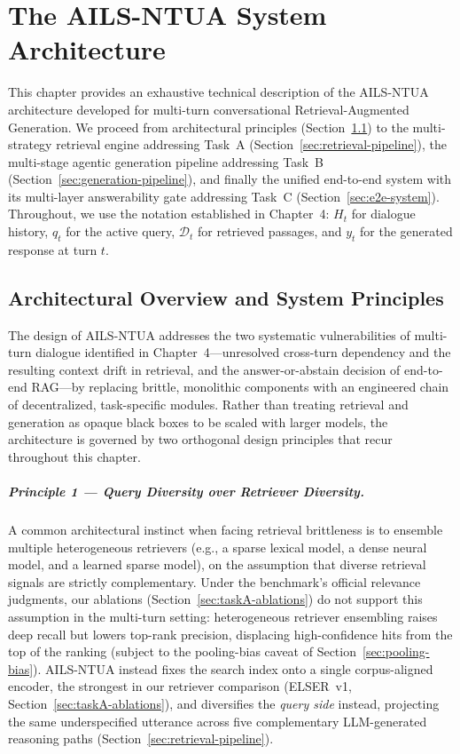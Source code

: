 \chapter{The AILS-NTUA System Architecture}
\label{chapter:system}

This chapter provides an exhaustive technical description of the AILS-NTUA architecture developed for multi-turn conversational Retrieval-Augmented Generation. We proceed from architectural principles (Section~\ref{sec:arch-overview}) to the multi-strategy retrieval engine addressing Task~A (Section~\ref{sec:retrieval-pipeline}), the multi-stage agentic generation pipeline addressing Task~B (Section~\ref{sec:generation-pipeline}), and finally the unified end-to-end system with its multi-layer answerability gate addressing Task~C (Section~\ref{sec:e2e-system}). Throughout, we use the notation established in Chapter~4: $H_t$ for dialogue history, $q_t$ for the active query, $\mathcal{D}_t$ for retrieved passages, and $y_t$ for the generated response at turn $t$.

\section{Architectural Overview and System Principles}
\label{sec:arch-overview}

The design of AILS-NTUA addresses the two systematic vulnerabilities of multi-turn dialogue identified in Chapter~4---unresolved cross-turn dependency and the resulting context drift in retrieval, and the answer-or-abstain decision of end-to-end RAG---by replacing brittle, monolithic components with an engineered chain of decentralized, task-specific modules. Rather than treating retrieval and generation as opaque black boxes to be scaled with larger models, the architecture is governed by two orthogonal design principles that recur throughout this chapter.

\paragraph{Principle 1 --- Query Diversity over Retriever Diversity.}
A common architectural instinct when facing retrieval brittleness is to ensemble multiple heterogeneous retrievers (e.g., a sparse lexical model, a dense neural model, and a learned sparse model), on the assumption that diverse retrieval signals are strictly complementary. Under the benchmark's official relevance judgments, our ablations (Section~\ref{sec:taskA-ablations}) do not support this assumption in the multi-turn setting: heterogeneous retriever ensembling raises deep recall but lowers top-rank precision, displacing high-confidence hits from the top of the ranking (subject to the pooling-bias caveat of Section~\ref{sec:pooling-bias}). AILS-NTUA instead fixes the search index onto a single corpus-aligned encoder, the strongest in our retriever comparison (ELSER~v1, Section~\ref{sec:taskA-ablations}), and diversifies the \emph{query side} instead, projecting the same underspecified utterance across five complementary LLM-generated reasoning paths (Section~\ref{sec:retrieval-pipeline}).

